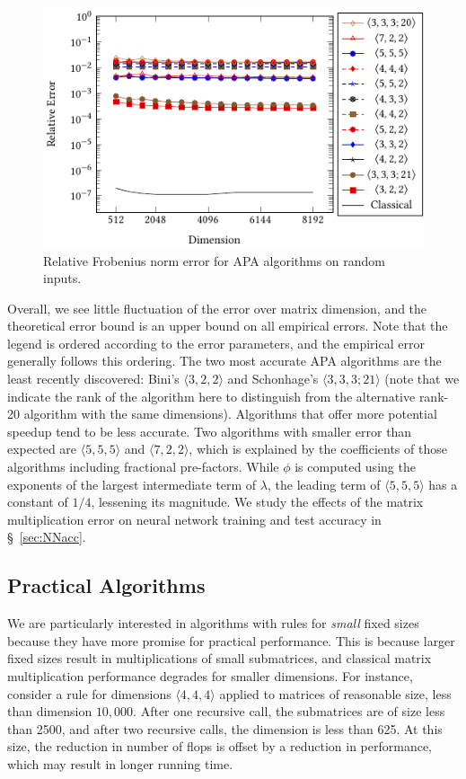 \documentclass[manuscript]{acmart}
\newcommand{\dims}[1]{\langle #1 \rangle}
\newcommand{\datafile}{}
\begin{document}
\begin{figure}
\centering
\renewcommand{\datafile}{data/matmul_acc.dat}
%
\includegraphics{tikz-taps/paper-figure0}
\caption{Relative Frobenius norm error for APA algorithms on random inputs.}
\label{fig:accuracy}
\end{figure}

Overall, we see little fluctuation of the error over matrix dimension, and the theoretical error bound is an upper bound on all empirical errors.
Note that the legend is ordered according to the error parameters, and the empirical error generally follows this ordering.
The two most accurate APA algorithms are the least recently discovered: Bini's $\dims{3,2,2}$ and Schonhage's $\dims{3,3,3;21}$ (note that we indicate the rank of the algorithm here to distinguish from the alternative rank-20 algorithm with the same dimensions).
Algorithms that offer more potential speedup tend to be less accurate.
Two algorithms with smaller error than expected are $\dims{5,5,5}$ and $\dims{7,2,2}$, which is explained by the coefficients of those algorithms including fractional pre-factors.
While $\phi$ is computed using the exponents of the largest intermediate term of $\lambda$, the leading term of $\dims{5,5,5}$ has a constant of $1/4$, lessening its magnitude. 
We study the effects of the matrix multiplication error on neural network training and test accuracy in \S~\ref{sec:NNacc}.

\subsection{Practical Algorithms}

We are particularly interested in algorithms with rules for \emph{small} fixed sizes because they have more promise for practical performance.
This is because larger fixed sizes result in multiplications of small submatrices, and classical matrix multiplication performance degrades for smaller dimensions.
For instance, consider a rule for dimensions $\dims{4,4,4}$ applied to matrices of reasonable size, less than dimension $10{,}000$.
After one recursive call, the submatrices are of size less than 2500, and after two recursive calls, the dimension is less than 625.
At this size, the reduction in number of flops is offset by a reduction in performance, which may result in longer running time.
\end{document}
